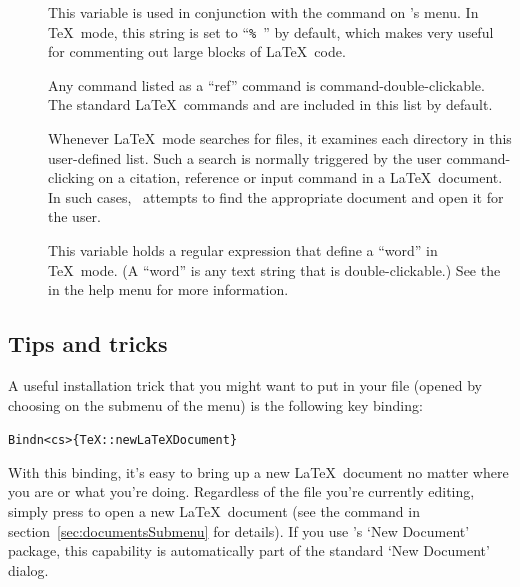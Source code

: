 \documentclass{report}
\begin{document}
\begin{description}
	\item[] This variable is used in 
	conjunction with the  command on \Alpha's 
	 menu.  In \TeX\ mode, this string is set to 
	``\verb*|% |'' by default, which makes  very 
	useful for commenting out large blocks of \LaTeX\ code.

	\item[] Any command listed as a ``ref'' command is 
	command-double-clickable.  The standard \LaTeX\ commands  
	and  are included in this list by default.

	\item[] Whenever \LaTeX\ mode searches for 
	files, it examines each directory in this user-defined list.  Such a 
	search is normally triggered by the user command-clicking on a 
	citation, reference or input command in a \LaTeX\ document.  In such 
	cases, \Alpha\ 
	attempts to find the appropriate document and open it for the user.
	
	\item[] This variable holds a regular expression
	that define a ``word'' in \TeX\ mode.  (A ``word'' is any text
	string that is double-clickable.)  See the  in
	the help menu for more information.

\end{description}%

\subsection{Tips and tricks}

A useful installation trick that you might want to put in your 
 file (opened by choosing  
on the \amenu{Global} submenu of the \amenu{Config} menu) 
is the following key binding:
\begin{alltt}
   Bind \straightquote{}n\straightquote <cs> \{TeX::newLaTeXDocument\}
\end{alltt}
With this binding, it's easy to bring up a new \LaTeX\ document no 
matter where you are or what you're doing.  Regardless of the file 
you're currently editing, simply press \key{Shf Cmd N} to open a new 
\LaTeX\ document (see the \acmd{New Document} command in 
section~\ref{sec:documentsSubmenu} for details).  If you use
\Alpha's `New Document' package, this capability is automatically
part of the standard `New Document' dialog.
\end{document}
